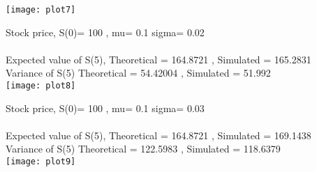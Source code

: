 \documentclass{article}
\begin{document}
\texttt{[image: plot7]}
\pagebreak 


Stock price, S(0)= 100 , mu= 0.1  sigma= 0.02 \\\\
 Expected value of S(5), Theoretical =  164.8721 , Simulated =  165.2831 \\
 Variance of S(5) Theoretical =  54.42004 , Simulated =  51.992 \\

\texttt{[image: plot8]}
\pagebreak 


Stock price, S(0)= 100 , mu= 0.1  sigma= 0.03 \\\\
 Expected value of S(5), Theoretical =  164.8721 , Simulated =  169.1438 \\
 Variance of S(5) Theoretical =  122.5983 , Simulated =  118.6379 \\

\texttt{[image: plot9]}
\pagebreak 
\end{document}
